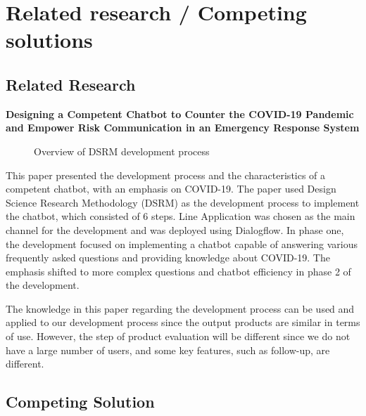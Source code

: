 \documentclass[12pt,oneside,openright,a4paper]{cpe-english-project}
\begin{document}
  \section{Related research / Competing solutions}
    \subsection{Related Research}
      \qquad \textbf{Designing a Competent Chatbot to Counter the COVID-19 Pandemic and Empower Risk Communication in an Emergency Response System}\par
      \begin{figure}[!h]
        \centering
        \caption{Overview of DSRM development process\cite{relatedwork1}}\label{fig:Research_1}
      \end{figure}
      \qquad This paper presented the development process and the characteristics of a competent chatbot, with an emphasis on COVID-19. The paper used Design Science Research Methodology (DSRM) as the development process to implement the chatbot, which consisted of 6 steps. Line Application was chosen as the main channel for the development and was deployed using Dialogflow. In phase one, the development focused on implementing a chatbot capable of answering various frequently asked questions and providing knowledge about COVID-19. The emphasis shifted to more complex questions and chatbot efficiency in phase 2 of the development.\par
      \qquad The knowledge in this paper regarding the development process can be used and applied to our development process since the output products are similar in terms of use. However, the step of product evaluation will be different since we do not have a large number of users, and some key features, such as follow-up, are different.\par
    \subsection{Competing Solution}
\end{document}
